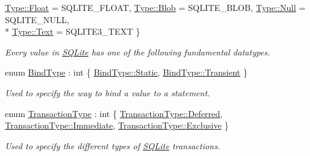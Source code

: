 \begin{DoxyCompactItemize}
\hyperlink{a00038_ad7a8ff5f375eca25eb6e3a51d746a04ca22ae0e2b89e5e3d477f988cc36d3272b}{Type\-::\-Float} = S\-Q\-L\-I\-T\-E\-\_\-\-F\-L\-O\-A\-T, 
\hyperlink{a00038_ad7a8ff5f375eca25eb6e3a51d746a04cae8016c85ada38bdc5fac616ec1318047}{Type\-::\-Blob} = S\-Q\-L\-I\-T\-E\-\_\-\-B\-L\-O\-B, 
\hyperlink{a00038_ad7a8ff5f375eca25eb6e3a51d746a04cabbb93ef26e3c101ff11cdd21cab08a94}{Type\-::\-Null} = S\-Q\-L\-I\-T\-E\-\_\-\-N\-U\-L\-L, 
\\*
\hyperlink{a00038_ad7a8ff5f375eca25eb6e3a51d746a04ca9dffbf69ffba8bc38bc4e01abf4b1675}{Type\-::\-Text} = S\-Q\-L\-I\-T\-E3\-\_\-\-T\-E\-X\-T
 \}
\begin{DoxyCompactList}\small\item\em Every value in \hyperlink{a00038}{S\-Q\-Lite} has one of the following fundamental datatypes. \end{DoxyCompactList}\item 
enum \hyperlink{a00038_a32877e51b309dd8f2a28c21c0ba4a6fd}{Bind\-Type} \-: int \{ \hyperlink{a00038_a32877e51b309dd8f2a28c21c0ba4a6fda84a8921b25f505d0d2077aeb5db4bc16}{Bind\-Type\-::\-Static}, 
\hyperlink{a00038_a32877e51b309dd8f2a28c21c0ba4a6fdab1f023eff9a6b5308d6024e4c6b3d475}{Bind\-Type\-::\-Transient}
 \}
\begin{DoxyCompactList}\small\item\em Used to specify the way to bind a value to a statement. \end{DoxyCompactList}\item 
enum \hyperlink{a00038_af94f2dd6dcae8699eada7a0382e48e66}{Transaction\-Type} \-: int \{ \hyperlink{a00038_af94f2dd6dcae8699eada7a0382e48e66a4ed71db54748b36eeb398876b0c747ac}{Transaction\-Type\-::\-Deferred}, 
\hyperlink{a00038_af94f2dd6dcae8699eada7a0382e48e66a43f6615bbb2c40a5306ff804094420b1}{Transaction\-Type\-::\-Immediate}, 
\hyperlink{a00038_af94f2dd6dcae8699eada7a0382e48e66a2ef50b4c466304dc6ac77bac8a779971}{Transaction\-Type\-::\-Exclusive}
 \}
\begin{DoxyCompactList}\small\item\em Used to specify the different types of \hyperlink{a00038}{S\-Q\-Lite} transactions. \end{DoxyCompactList}\end{DoxyCompactItemize}
